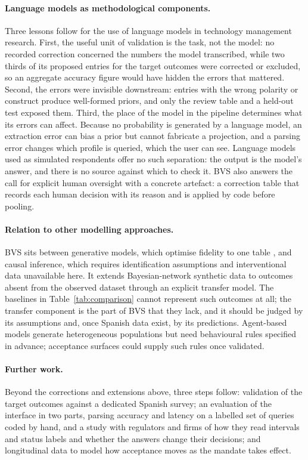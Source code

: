 \paragraph{Language models as methodological components.}
Three lessons follow for the use of language models in technology management
research. First, the useful unit of validation is the task, not the model: no
recorded correction concerned the numbers the model transcribed, while two
thirds of its proposed entries for the target outcomes were corrected or
excluded, so an aggregate accuracy figure would have hidden the errors that
mattered. Second, the errors were invisible downstream: entries
with the wrong polarity or construct produce well-formed priors, and only the
review table and a held-out test exposed them. Third, the place of the model in
the pipeline determines what its errors can affect. Because no probability is
generated by a language model, an extraction error can bias a prior but cannot
fabricate a projection, and a parsing error changes which profile is queried,
which the user can see. Language models used as simulated respondents
\citep{argyle2023} offer no such separation: the output is the model's answer,
and there is no source against which to check it. BVS also answers the call for
explicit human oversight \citep{hajikhani2024} with a concrete artefact: a
correction table that records each human decision with its reason and is
applied by code before pooling.

\paragraph{Relation to other modelling approaches.}
BVS sits between generative models, which optimise fidelity to one table
\citep{xu2019}, and causal inference, which requires identification
assumptions and interventional data unavailable here. It extends
Bayesian-network synthetic data \citep{martins2024} to outcomes absent from the
observed dataset through an explicit transfer model. The baselines in
Table~\ref{tab:comparison} cannot represent such outcomes at all; the transfer
component is the part of BVS that they lack, and it should be judged by its
assumptions and, once Spanish data exist, by its predictions. Agent-based models
generate heterogeneous populations but need behavioural rules specified in
advance; acceptance surfaces could supply such rules once validated.

\paragraph{Further work.}
Beyond the corrections and extensions above, three steps follow: validation of
the target outcomes against a dedicated Spanish survey; an evaluation of the
interface in two parts, parsing accuracy and latency on a labelled set of
queries coded by hand, and a study with regulators and firms of how they read
intervals and status labels and whether the answers change their decisions;
and longitudinal data to model how acceptance moves as the
mandate takes effect.


